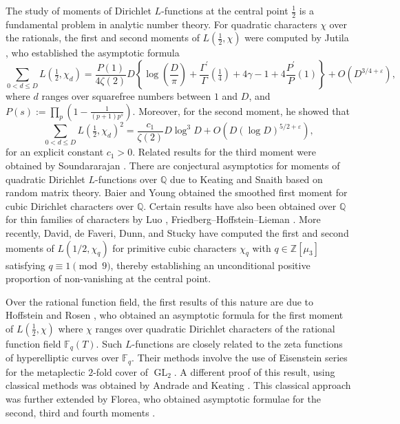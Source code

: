 \documentclass[table]{amsart}
\newcommand{\Q}{\mathbb{Q}}
\newcommand{\F}{\mathbb{F}}
\newcommand{\op}[1]{\operatorname{#1}}
\numberwithin{equation}{section}
\begin{document}
The study of moments of Dirichlet \( L \)-functions at the central point \( \tfrac{1}{2} \) is a fundamental problem in analytic number theory. For quadratic characters \( \chi \) over the rationals, the first and second moments of \( L(\tfrac{1}{2}, \chi) \) were computed by Jutila \cite{Jutila}, who established the asymptotic formula
\[
\sum_{0<d \leqslant D} L\left(\tfrac{1}{2}, \chi_{d}\right)= \frac{P(1)}{4 \zeta(2)} D\left\{\log \left(\frac{D}{\pi}\right)+\frac{\Gamma^{\prime}}{\Gamma}\left(\tfrac{1}{4}\right)+4 \gamma - 1 + 4 \frac{P^{\prime}}{P}(1)\right\} +O\left(D^{3/4+\varepsilon}\right),
\]
where $d$ ranges over squarefree numbers between $1$ and $D$, and $P(s):=\prod_{p}\left(1-\frac{1}{(p+1)p^{s}}\right)$.
Moreover, for the second moment, he showed that
\[
\sum_{0<d \leqslant D} L\left(\tfrac{1}{2}, \chi_{d}\right)^{2}=\frac{c_1}{\zeta(2)} D \log^{3} D + O\left(D(\log D)^{5/2+\varepsilon}\right),
\]
for an explicit constant $c_1>0$.
Related results for the third moment were obtained by Soundararajan \cite{Sound}. There are conjectural asymptotics for moments of quadratic Dirichlet $L$-functions over $\Q$ due to Keating and Snaith \cite{keatingsnaith} based on random matrix theory. Baier and Young \cite{baieryoung} obtained the smoothed first moment for cubic Dirichlet characters over $\Q$. Certain results have also been obtained over $\Q$ for thin families of characters by Luo \cite{Luo}, Friedberg--Hoffstein--Lieman \cite{FHL}. More recently, David, de Faveri, Dunn, and Stucky \cite{david2024non} have computed the first and second moments of $L(1/2, \chi_q)$ for primitive cubic characters $\chi_q$ with $q \in \mathbb{Z}[\mu_3]$ satisfying $q \equiv 1 \pmod{9}$, thereby establishing an unconditional positive proportion of non-vanishing at the central point.
\par Over the rational function field, the first results of this nature are due to Hoffstein and Rosen \cite{HoffsteinRosen}, who obtained an asymptotic formula for the first moment of $L(\frac{1}{2}, \chi)$ where $\chi$ ranges over quadratic Dirichlet characters of the rational function field $\F_q(T)$. Such $L$-functions are closely related to the zeta functions of hyperelliptic curves over $\F_q$. Their methods involve the use of Eisenstein series for the metaplectic $2$-fold cover of $\op{GL}_2$. A different proof of this result, using classical methods was obtained by Andrade and Keating \cite{andradekeating}. This classical approach was further extended by Florea, who obtained asymptotic formulae for the second, third and fourth moments \cite{Florea2ndand3rd, Florea4th}. 
\end{document}
